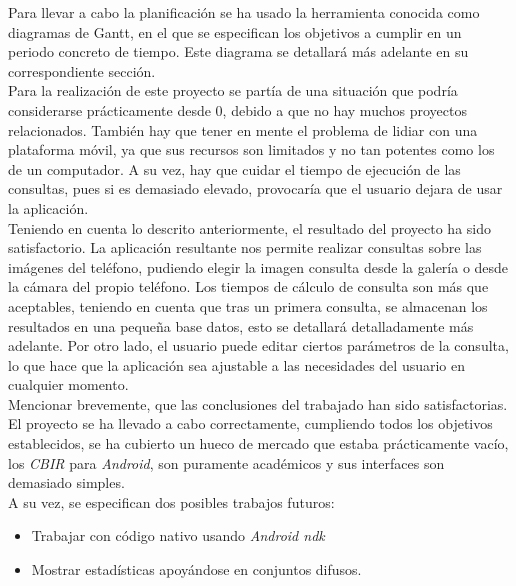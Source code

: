 Para llevar a cabo la planificación se ha usado la herramienta conocida como diagramas de Gantt, en el que se especifican los objetivos a cumplir en un periodo concreto de tiempo. Este diagrama se detallará más adelante en su correspondiente sección.\\

Para la realización de este proyecto se partía de una situación que podría considerarse prácticamente desde 0, debido a que no hay muchos proyectos relacionados. También hay que tener en mente el problema de lidiar con una plataforma móvil, ya que sus recursos son limitados y no tan potentes como los de un computador. A su vez, hay que cuidar el tiempo de ejecución de las consultas, pues si es demasiado elevado, provocaría que el usuario dejara de usar la aplicación.\\

Teniendo en cuenta lo descrito anteriormente, el resultado del proyecto ha sido satisfactorio. La aplicación resultante nos permite realizar consultas sobre las imágenes del teléfono, pudiendo elegir la imagen consulta desde la galería o desde la cámara del propio teléfono. Los tiempos de cálculo de consulta son más que aceptables, teniendo en cuenta que tras un primera consulta, se almacenan los resultados en una pequeña base datos, esto se detallará detalladamente más adelante. Por otro lado, el usuario puede editar ciertos parámetros de la consulta, lo que hace que la aplicación sea ajustable a las necesidades del usuario en cualquier momento.\\

Mencionar brevemente, que las conclusiones del trabajado han sido satisfactorias. El proyecto se ha llevado a cabo correctamente, cumpliendo todos los objetivos establecidos, se ha cubierto un hueco de mercado que estaba prácticamente vacío, los \textit{CBIR} para \textit{Android}, son puramente académicos y sus interfaces son demasiado simples.\\

A su vez, se especifican dos posibles trabajos futuros:

\begin{itemize}

\item Trabajar con código nativo usando \textit{Android ndk}

\item Mostrar estadísticas apoyándose en conjuntos difusos.

\end{itemize}


